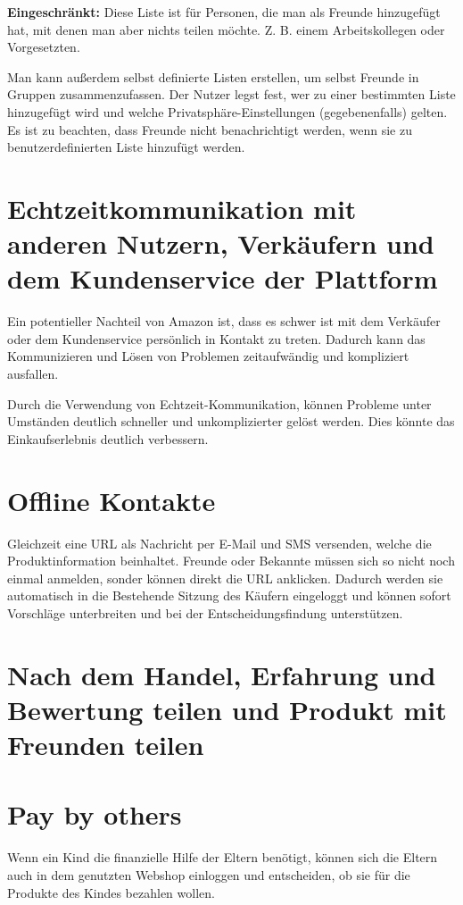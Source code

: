 \textbf{Eingeschränkt:} Diese Liste ist für Personen, die man als Freunde hinzugefügt hat, mit denen man aber nichts teilen möchte. Z. B. einem Arbeitskollegen oder Vorgesetzten.

Man kann außerdem selbst definierte Listen erstellen,  um selbst Freunde in Gruppen zusammenzufassen. Der Nutzer legst fest, wer zu einer bestimmten Liste hinzugefügt wird und welche Privatsphäre-Einstellungen (gegebenenfalls) gelten. Es ist zu beachten, dass Freunde nicht benachrichtigt werden, wenn sie zu benutzerdefinierten Liste hinzufügt werden.


\section{Echtzeitkommunikation mit anderen Nutzern, Verkäufern und dem Kundenservice der Plattform}

Ein potentieller Nachteil von Amazon ist, dass es schwer ist mit dem Verkäufer oder dem Kundenservice persönlich in Kontakt zu treten. Dadurch kann das Kommunizieren und Lösen von Problemen zeitaufwändig und kompliziert ausfallen.

Durch die Verwendung von Echtzeit-Kommunikation, können Probleme unter Umständen deutlich schneller und unkomplizierter gelöst werden. Dies könnte das Einkaufserlebnis deutlich verbessern.


\section{Offline Kontakte}

Gleichzeit eine URL als Nachricht per E-Mail und SMS versenden, welche die Produktinformation beinhaltet. Freunde oder Bekannte müssen sich so nicht noch einmal anmelden, sonder können direkt die URL anklicken. Dadurch werden sie automatisch in die Bestehende Sitzung des Käufern eingeloggt und können sofort Vorschläge unterbreiten und bei der Entscheidungsfindung unterstützen.


\section{Nach dem Handel, Erfahrung und Bewertung teilen und Produkt mit Freunden teilen}


\section{Pay by others}

Wenn ein Kind die finanzielle Hilfe der Eltern benötigt, können sich die Eltern auch in dem genutzten Webshop einloggen und entscheiden, ob sie für die Produkte des Kindes bezahlen wollen.


